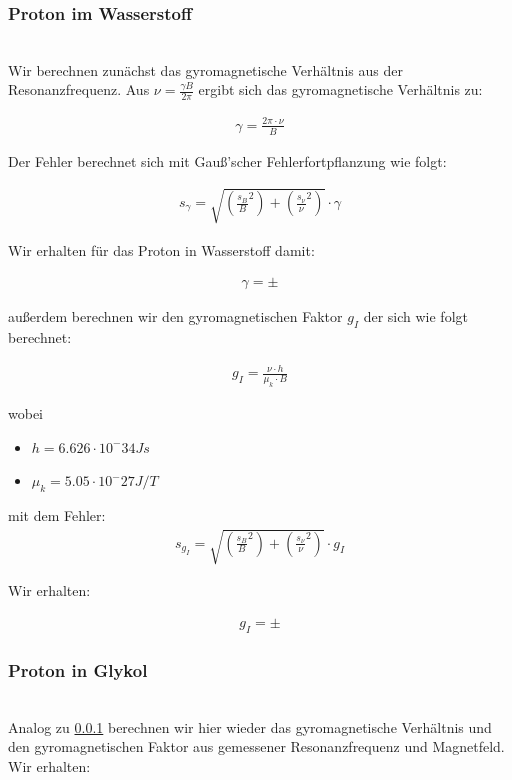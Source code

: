 \documentclass[12pt]{article}
\begin{document}
\subsubsection{Proton im Wasserstoff} \label{Rechnung}
\ \\
Wir berechnen zunächst das gyromagnetische Verhältnis aus der Resonanzfrequenz. Aus $\nu=\frac{\gamma B}{2\pi}$ ergibt sich das gyromagnetische Verhältnis zu:

\begin{align*}
\gamma = \frac{2\pi \cdot \nu}{B}
\end{align*}

Der Fehler berechnet sich mit Gauß'scher Fehlerfortpflanzung wie folgt:

\begin{align*}
s_{\gamma} = \sqrt{\left(\frac{s_B}{B}^2\right)+\left(\frac{s_\nu}{\nu}^2 \right)}\cdot \gamma
\end{align*}

Wir erhalten für das Proton in Wasserstoff damit: 

\begin{align*}
\gamma =  \pm
\end{align*}

außerdem berechnen wir den gyromagnetischen Faktor $g_I$ der sich wie folgt berechnet: 

\begin{align*}
g_I = \frac{\nu \cdot h}{\mu_k \cdot B}
\end{align*}

wobei 
\begin{itemize}
	\item $h =  6.626 \cdot 10^-34 Js$
	\item $\mu_k = 5.05 \cdot 10^-27 J/T$
\end{itemize}

mit dem Fehler:
\begin{align*}
s_{g_I} = \sqrt{\left(\frac{s_B}{B}^2\right)+\left(\frac{s_\nu}{\nu}^2 \right)}\cdot g_I
\end{align*}

Wir erhalten:

\begin{align*}
g_I =   \pm
\end{align*}
\subsubsection{Proton in Glykol}
\ \\

Analog zu \ref{Rechnung} berechnen wir hier wieder das gyromagnetische Verhältnis und den gyromagnetischen Faktor aus gemessener Resonanzfrequenz und Magnetfeld. Wir erhalten:
\end{document}
